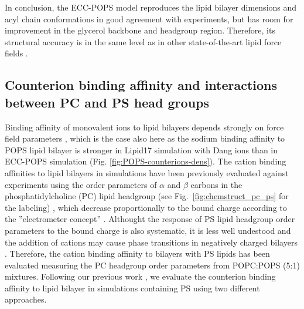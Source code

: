 \documentclass[journal=jpcbfk,manuscript=article]{achemso}
\begin{document}

In conclusion, the ECC-POPS model reproduces the lipid bilayer dimensions and
acyl chain conformations in good agreement with experiments, but has room for
improvement in the glycerol backbone and headgroup region. Therefore,
its structural accuracy is in the same level as in other state-of-the-art
lipid force fields \cite{botan15, ollila16, Pluhackova2016, nmrlipids_proj4}.
 
 
\subsection{Counterion binding affinity and interactions between PC and PS head groups}

Binding affinity of monovalent ions to lipid bilayers depends strongly on
force field parameters \cite{catte16,melcr18,nmrlipids_proj4},
which is the case also here as the sodium binding affinity to
POPS lipid bilayer is stronger in Lipid17 simulation with Dang ions than in
ECC-POPS simulation (Fig. \ref{fig:POPS-counterions-dens}).
The cation binding affinities to lipid bilayers in simulations have been previously evaluated
against experiments using the order parameters of $\alpha$ and $\beta$ carbons in the
phosphatidylcholine (PC) lipid headgroup (see Fig.~\ref{fig:chemstruct_pc_ps} for the labeling) \cite{catte16,melcr18,nmrlipids_proj4},
which decrease proportionally to the bound charge according to the ''electrometer concept'' \citep{seelig87}.
Althought the response of PS lipid headgroup order parameters to the bound charge is also systematic,
it is less well undestood and the addition of cations may cause phase transitions in negatively charged
bilayers \cite{feigenson86,mattai89,roux91,roux90}. Therefore, the cation binding affinity to bilayers with
PS lipids has been evaluated measuring the PC headgroup order parameters from POPC:POPS (5:1)
mixtures\cite{roux90,nmrlipids_proj4}.
Following our previous work \cite{nmrlipids_proj4}, we evaluate the counterion binding affinity
to lipid bilayer in simulations containing PS using two different approaches.

\end{document}
